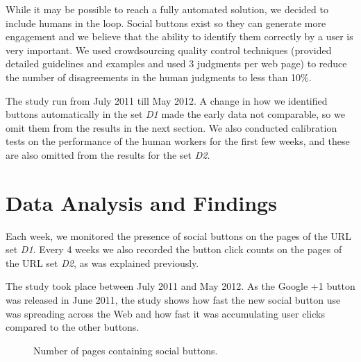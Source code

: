 \documentclass{sig-alternate}
\begin{document}
While it may be possible to reach a fully automated solution, we decided to include humans in the loop. Social buttons exist so they can generate more engagement and we believe that the ability to identify them correctly by a user is very important.
We used crowdsourcing quality control techniques (provided detailed guidelines and examples and used 3 judgments per web page) to reduce the number of disagreements in the human judgments to less than 10\%.

The study run from July 2011 till May 2012. A change in how we identified buttons automatically in the set \emph{D1} made the early data not comparable, so we omit them from the results in the next section. We also conducted calibration tests on the performance of the human workers for the first few weeks, and these are also omitted from the results for the set \emph{D2}. 


\section{Data Analysis and Findings}

Each week, we monitored the presence of social buttons on the pages of the URL set \emph{D1}. Every 4 weeks we also recorded the button click counts on the pages of the URL set \emph{D2}, as was explained previously.

The study took place between July 2011 and May 2012.  As the Google +1 button was released in June 2011, the study shows how fast the new social button use was spreading across the Web and how fast it was accumulating user clicks compared to the other buttons.

\begin{figure}[h]
\centering
{}
 \caption{Number of pages containing social buttons.}
\label{fig:button_presence}
\end{figure}
\end{document}
